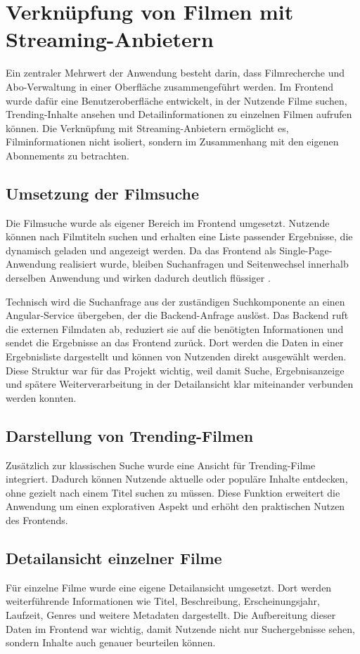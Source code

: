 \section{Verknüpfung von Filmen mit Streaming-Anbietern}
Ein zentraler Mehrwert der Anwendung besteht darin, dass Filmrecherche und Abo-Verwaltung in einer Oberfläche zusammengeführt werden. Im Frontend wurde dafür eine Benutzeroberfläche entwickelt, in der Nutzende Filme suchen, Trending-Inhalte ansehen und Detailinformationen zu einzelnen Filmen aufrufen können. Die Verknüpfung mit Streaming-Anbietern ermöglicht es, Filminformationen nicht isoliert, sondern im Zusammenhang mit den eigenen Abonnements zu betrachten.

\subsection{Umsetzung der Filmsuche}
Die Filmsuche wurde als eigener Bereich im Frontend umgesetzt. Nutzende können nach Filmtiteln suchen und erhalten eine Liste passender Ergebnisse, die dynamisch geladen und angezeigt werden. Da das Frontend als Single-Page-Anwendung realisiert wurde, bleiben Suchanfragen und Seitenwechsel innerhalb derselben Anwendung und wirken dadurch deutlich flüssiger \cite{mdn_spa,angular_routing}.

Technisch wird die Suchanfrage aus der zuständigen Suchkomponente an einen Angular-Service übergeben, der die Backend-Anfrage auslöst. Das Backend ruft die externen Filmdaten ab, reduziert sie auf die benötigten Informationen und sendet die Ergebnisse an das Frontend zurück. Dort werden die Daten in einer Ergebnisliste dargestellt und können von Nutzenden direkt ausgewählt werden. Diese Struktur war für das Projekt wichtig, weil damit Suche, Ergebnisanzeige und spätere Weiterverarbeitung in der Detailansicht klar miteinander verbunden werden konnten.

\subsection{Darstellung von Trending-Filmen}
Zusätzlich zur klassischen Suche wurde eine Ansicht für Trending-Filme integriert. Dadurch können Nutzende aktuelle oder populäre Inhalte entdecken, ohne gezielt nach einem Titel suchen zu müssen. Diese Funktion erweitert die Anwendung um einen explorativen Aspekt und erhöht den praktischen Nutzen des Frontends.

\subsection{Detailansicht einzelner Filme}
Für einzelne Filme wurde eine eigene Detailansicht umgesetzt. Dort werden weiterführende Informationen wie Titel, Beschreibung, Erscheinungsjahr, Laufzeit, Genres und weitere Metadaten dargestellt. Die Aufbereitung dieser Daten im Frontend war wichtig, damit Nutzende nicht nur Suchergebnisse sehen, sondern Inhalte auch genauer beurteilen können.

